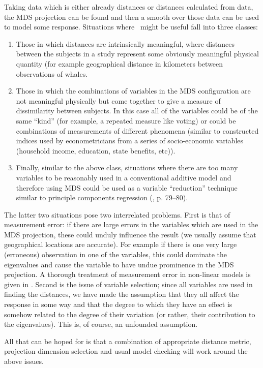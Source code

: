 Taking data which is either already distances or distances calculated from data, the MDS projection can be found and then a smooth over those data can be used to model some response. Situations where \mdsds\ might be useful fall into three classes: 
\begin{enumerate}
\item Those in which distances are intrinsically meaningful, where distances between the subjects in a study represent some obviously meaningful physical quantity (for example geographical distance in kilometers between observations of whales.
\item Those in which the combinations of variables in the MDS configuration are not meaningful physically but come together to give a measure of dissimilarity between subjects. In this case all of the variables could be of the same ``kind'' (for example, a repeated measure like voting) or could be combinations of measurements of different phenomena (similar to constructed indices used by econometricians from a series of socio-economic variables (household income, education, state benefits, etc)).
\item Finally, similar to the above class, situations where there are too many variables to be reasonably used in a conventional additive model and therefore using MDS could be used as a variable ``reduction'' technique similar to principle components regression (\cite{elements}, p. 79--80).
\end{enumerate}
The latter two situations pose two interrelated problems. First is that of measurement error: if there are large errors in the variables which are used in the MDS projection, these could unduly influence the result (we usually assume that geographical locations are accurate). For example if there is one very large (erroneous) observation in one of the variables, this could dominate the eigenvalues and cause the variable to have undue prominence in the MDS projection. A thorough treatment of measurement error in non-linear models is given in \cite{measurementerror}. Second is the issue of variable selection; since all variables are used in finding the distances, we have made the assumption that they all affect the response in some way and that the degree to which they have an effect is somehow related to the degree of their variation (or rather, their contribution to the eigenvalues). This is, of course, an unfounded assumption.

All that can be hoped for is that a combination of appropriate distance metric, projection dimension selection and usual model checking will work around the above issues.


